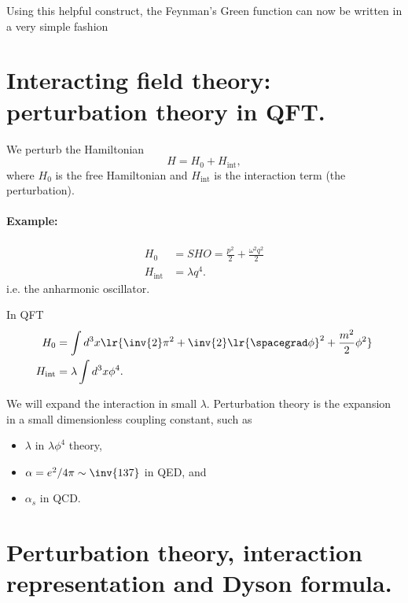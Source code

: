 Using this helpful construct, the Feynman's Green function can now be written in a very simple fashion

\section{Interacting field theory: perturbation theory in QFT.}

We perturb the Hamiltonian
\begin{dmath}\label{eqn:qftLecture13:500}
H = H_0 + H_{\text{int}},
\end{dmath}
where \( H_0 \) is the free Hamiltonian and \( H_{\text{int}} \) is the interaction term (the perturbation).

\paragraph{Example:}

\begin{equation}\label{eqn:qftLecture13:460}
\begin{aligned}
H_0 &= SHO = \frac{p^2}{2} + \frac{\omega^2 q^2}{2} \\
H_{\text{int}} &= \lambda q^4.
\end{aligned}
\end{equation}
i.e.  the anharmonic oscillator.

In QFT
\begin{dmath}\label{eqn:qftLecture13:480}
\begin{aligned}
H_0 &=
\int d^3 x \lr{ \inv{2} \pi^2 + \inv{2} \lr{ \spacegrad \phi}^2 + \frac{m^2}{2} \phi^2 } \\
H_{\text{int}} &=
\lambda \int d^3 x \phi^4.
\end{aligned}
\end{dmath}

We will expand the interaction in small \( \lambda \).  Perturbation theory is the expansion in a small dimensionless coupling constant, such as
\begin{itemize}
\item \( \lambda \) in \( \lambda \phi^4 \) theory,
\item \( \alpha = e^2/4 \pi \sim \inv{137} \) in QED, and
\item \( \alpha_s \) in QCD.
\end{itemize}

\section{Perturbation theory, interaction representation and Dyson formula.}

